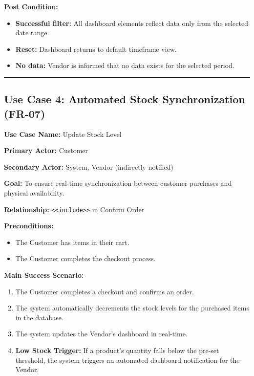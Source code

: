 \textbf{Post Condition:}
\begin{itemize}
    \item \textbf{Successful filter:} All dashboard elements reflect data only from the selected date range.
    \item \textbf{Reset:} Dashboard returns to default timeframe view.
    \item \textbf{No data:} Vendor is informed that no data exists for the selected period.
\end{itemize}

\vspace{0.5cm}
\hrule
\vspace{0.5cm}

\subsection*{Use Case 4: Automated Stock Synchronization (FR-07)}

\textbf{Use Case Name:} Update Stock Level

\textbf{Primary Actor:} Customer

\textbf{Secondary Actor:} System, Vendor (indirectly notified)

\textbf{Goal:} To ensure real-time synchronization between customer purchases and physical availability.

\textbf{Relationship:} \texttt{\textless\textless include\textgreater\textgreater} in Confirm Order

\textbf{Preconditions:}
\begin{itemize}
    \item The Customer has items in their cart.
    \item The Customer completes the checkout process.
\end{itemize}

\textbf{Main Success Scenario:}
\begin{enumerate}
    \item The Customer completes a checkout and confirms an order.
    \item The system automatically decrements the stock levels for the purchased items in the database.
    \item The system updates the Vendor's dashboard in real-time.
    \item \textbf{Low Stock Trigger:} If a product's quantity falls below the pre-set threshold, the system triggers an automated dashboard notification for the Vendor.
\end{enumerate}

